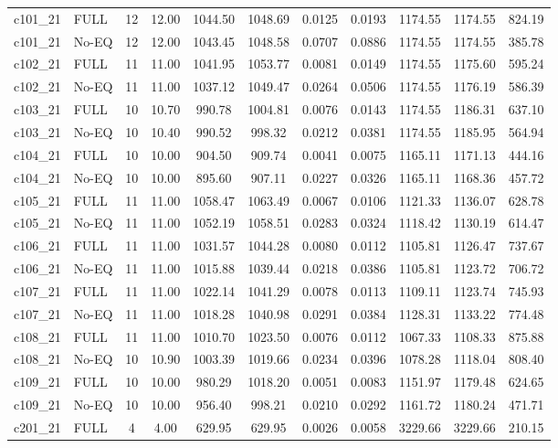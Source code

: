 \begin{longtable}{@{\extracolsep{\fill}}llccccccccc@{}}
c101\_21 & FULL & 12 & 12.00 & 1044.50 & 1048.69 & 0.0125 & 0.0193 & 1174.55 & 1174.55 & 824.19 \\
c101\_21 & No-EQ & 12 & 12.00 & 1043.45 & 1048.58 & 0.0707 & 0.0886 & 1174.55 & 1174.55 & 385.78 \\
\midrule
c102\_21 & FULL & 11 & 11.00 & 1041.95 & 1053.77 & 0.0081 & 0.0149 & 1174.55 & 1175.60 & 595.24 \\
c102\_21 & No-EQ & 11 & 11.00 & 1037.12 & 1049.47 & 0.0264 & 0.0506 & 1174.55 & 1176.19 & 586.39 \\
\midrule
c103\_21 & FULL & 10 & 10.70 & 990.78 & 1004.81 & 0.0076 & 0.0143 & 1174.55 & 1186.31 & 637.10 \\
c103\_21 & No-EQ & 10 & 10.40 & 990.52 & 998.32 & 0.0212 & 0.0381 & 1174.55 & 1185.95 & 564.94 \\
\midrule
c104\_21 & FULL & 10 & 10.00 & 904.50 & 909.74 & 0.0041 & 0.0075 & 1165.11 & 1171.13 & 444.16 \\
c104\_21 & No-EQ & 10 & 10.00 & 895.60 & 907.11 & 0.0227 & 0.0326 & 1165.11 & 1168.36 & 457.72 \\
\midrule
c105\_21 & FULL & 11 & 11.00 & 1058.47 & 1063.49 & 0.0067 & 0.0106 & 1121.33 & 1136.07 & 628.78 \\
c105\_21 & No-EQ & 11 & 11.00 & 1052.19 & 1058.51 & 0.0283 & 0.0324 & 1118.42 & 1130.19 & 614.47 \\
\midrule
c106\_21 & FULL & 11 & 11.00 & 1031.57 & 1044.28 & 0.0080 & 0.0112 & 1105.81 & 1126.47 & 737.67 \\
c106\_21 & No-EQ & 11 & 11.00 & 1015.88 & 1039.44 & 0.0218 & 0.0386 & 1105.81 & 1123.72 & 706.72 \\
\midrule
c107\_21 & FULL & 11 & 11.00 & 1022.14 & 1041.29 & 0.0078 & 0.0113 & 1109.11 & 1123.74 & 745.93 \\
c107\_21 & No-EQ & 11 & 11.00 & 1018.28 & 1040.98 & 0.0291 & 0.0384 & 1128.31 & 1133.22 & 774.48 \\
\midrule
c108\_21 & FULL & 11 & 11.00 & 1010.70 & 1023.50 & 0.0076 & 0.0112 & 1067.33 & 1108.33 & 875.88 \\
c108\_21 & No-EQ & 10 & 10.90 & 1003.39 & 1019.66 & 0.0234 & 0.0396 & 1078.28 & 1118.04 & 808.40 \\
\midrule
c109\_21 & FULL & 10 & 10.00 & 980.29 & 1018.20 & 0.0051 & 0.0083 & 1151.97 & 1179.48 & 624.65 \\
c109\_21 & No-EQ & 10 & 10.00 & 956.40 & 998.21 & 0.0210 & 0.0292 & 1161.72 & 1180.24 & 471.71 \\
\midrule
c201\_21 & FULL & 4 & 4.00 & 629.95 & 629.95 & 0.0026 & 0.0058 & 3229.66 & 3229.66 & 210.15 \\

\end{longtable}

